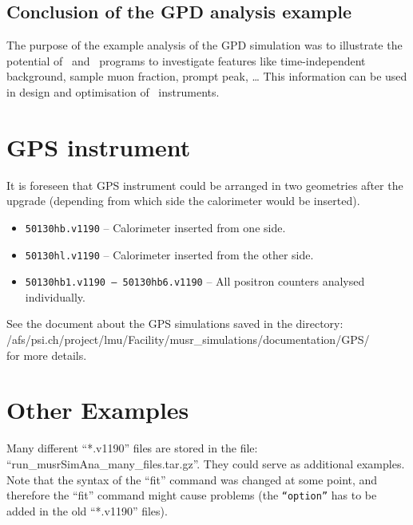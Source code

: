 \documentclass[twoside]{dis04}
\begin{document}
\subsection{Conclusion of the GPD analysis example}
%
The purpose of the example analysis of the GPD simulation was to illustrate
the potential of \musrSim\ and \musrSimAna\ programs to investigate features
like time-independent background, sample muon fraction, prompt peak, \ldots
This information can be used in design and optimisation of \musr\ instruments.
\section{GPS instrument}
%
It is foreseen that GPS instrument could be arranged in two geometries
after the upgrade (depending from which side the calorimeter would be
inserted). 
\begin{itemize}
  \item {\tt 50130hb.v1190} -- Calorimeter inserted from one side.
  \item {\tt 50130hl.v1190} -- Calorimeter inserted from the other side.
  \item {\tt 50130hb1.v1190 -- 50130hb6.v1190} -- All positron counters 
    analysed individually.
\end{itemize}
See the document about the GPS simulations saved in the directory: \\
/afs/psi.ch/project/lmu/Facility/musr\_simulations/documentation/GPS/ \\
for more details.
\section{Other Examples}
Many different ``*.v1190'' files are stored in the file:
``run\_musrSimAna\_many\_files.tar.gz''.  They could serve as additional examples.
Note that the syntax of the ``fit'' command was changed
at some point, and therefore the ``fit'' command might cause problems
(the {\tt ``option''} has to be added in the old ``*.v1190'' files).
\end{document}
